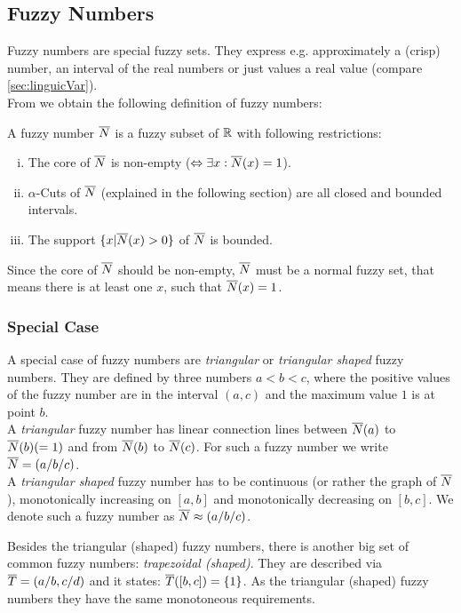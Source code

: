\subsection{Fuzzy Numbers} \label{sec:fuzzyNumbers}
Fuzzy numbers are special fuzzy sets. They express e.g. approximately a (crisp) number, an interval of the real numbers or just values  a real value (compare \ref{sec:linguicVar}). \\
From \cite{IntrFuzzyLogic} we obtain the following definition of fuzzy numbers:

A fuzzy number $\overline{N}$ is a fuzzy subset of $\mathbb{R}$ with following restrictions:
\begin{enumerate}[(i)]
\item The core of $\overline{N}$ is non-empty ($\Leftrightarrow \exists x: \overline{N}(x)=1$).
\item $\alpha$-Cuts of $\overline{N}$ (explained in the following section) are all closed and bounded intervals.
\item The support $\{ x | \overline{N}(x)>0 \}$ of $\overline{N}$ is bounded.
\end{enumerate}
Since the core of $\overline{N}$ should be non-empty, $\overline{N}$ must be a normal fuzzy set, that means there is at least one $x$, such that $\overline{N}(x)=1$.


\subsubsection*{Special Case}
A special case of fuzzy numbers are \emph{triangular} or \emph{triangular shaped} fuzzy numbers. They are defined by three numbers $a<b<c$, where the positive values of the fuzzy number are in the interval $(a,c)$ and the maximum value $1$ is at point $b$.\\
A \emph{triangular} fuzzy number has linear connection lines between $\overline{N}(a)$ to $\overline{N}(b)(=1)$ and from $\overline{N}(b)$ to $\overline{N}(c)$. For such a fuzzy number we write $\overline{N}=(a/b/c)$.\\
A \emph{triangular shaped} fuzzy number has to be continuous (or rather the graph of $\overline{N}$), monotonically increasing on $[a,b]$ and monotonically decreasing on $[b,c]$. We denote such a fuzzy number as $\overline{N}\approx (a/b/c)$.

Besides the triangular (shaped) fuzzy numbers, there is another big set of common fuzzy numbers: \emph{trapezoidal (shaped)}. They are described via $\overline{T}=(a/b,c/d)$ and it states: $\overline{T}([b,c])=\{1\}$. As the triangular (shaped) fuzzy numbers they have the same monotoneous requirements.

